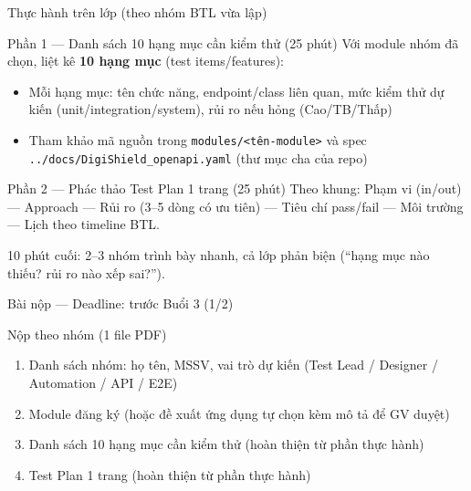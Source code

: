 \documentclass[aspectratio=169,12pt]{beamer}
\begin{document}
\begin{frame}{Thực hành trên lớp (theo nhóm BTL vừa lập)}
  \begin{block}{Phần 1 --- Danh sách 10 hạng mục cần kiểm thử (25 phút)}
    Với module nhóm đã chọn, liệt kê \textbf{10 hạng mục} (test items/features):
    \begin{itemize}
      \item \small Mỗi hạng mục: tên chức năng, endpoint/class liên quan, mức kiểm thử
            dự kiến (unit/integration/system), rủi ro nếu hỏng (Cao/TB/Thấp)
      \item \small Tham khảo mã nguồn trong \texttt{modules/<tên-module>} và spec
            \texttt{../docs/DigiShield\_openapi.yaml} (thư mục cha của repo)
    \end{itemize}
  \end{block}

  \vspace{0.3em}
  \begin{block}{Phần 2 --- Phác thảo Test Plan 1 trang (25 phút)}
    Theo khung: Phạm vi (in/out) --- Approach --- Rủi ro (3--5 dòng có ưu tiên) ---
    Tiêu chí pass/fail --- Môi trường --- Lịch theo timeline BTL.
  \end{block}

  \vspace{0.3em}
  \small 10 phút cuối: 2--3 nhóm trình bày nhanh, cả lớp phản biện
  (``hạng mục nào thiếu? rủi ro nào xếp sai?'').
\end{frame}

\begin{frame}{Bài nộp --- Deadline: trước Buổi 3 (1/2)}
  \begin{block}{Nộp theo nhóm (1 file PDF)}
    \begin{enumerate}
      \item Danh sách nhóm: họ tên, MSSV, vai trò dự kiến (Test Lead / Designer /
            Automation / API / E2E)
      \item Module đăng ký (hoặc đề xuất ứng dụng tự chọn kèm mô tả để GV duyệt)
      \item Danh sách 10 hạng mục cần kiểm thử (hoàn thiện từ phần thực hành)
      \item Test Plan 1 trang (hoàn thiện từ phần thực hành)
    \end{enumerate}
  \end{block}
\end{frame}
\end{document}
